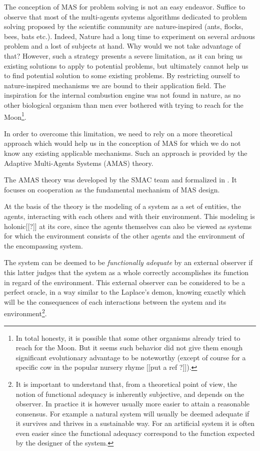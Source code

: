 The conception of MAS for problem solving is not an easy endeavor. Suffice to observe that most of the multi-agents systems algorithms dedicated to problem solving proposed by the scientific community are nature-inspired (ants, flocks, bees, bats etc.). Indeed, Nature had a long time to experiment on several arduous problem and a lost of subjects at hand. Why would we not take advantage of that? However, such a strategy presents a severe limitation, as it can bring us existing solutions to apply to potential problems, but ultimately cannot help us to find potential solution to some existing problems. By restricting ourself to nature-inspired mechanisms we are bound to their application field.
The inspiration for the internal combustion engine was not found in nature, as no other biological organism than men ever bothered with trying to reach for the Moon\footnote{In total honesty, it is possible that some other organisms already tried to reach for the Moon. But it seems such behavior did not give them enough significant evolutionary advantage to be noteworthy (except of course for a specific cow in the popular nursery rhyme [[put a ref ?]]).}.

In order to overcome this limitation, we need to rely on a more theoretical approach which would help us in the conception of MAS for which we do not know any existing applicable mechanisms. Such an approach is provided by the Adaptive Multi-Agents Systems (AMAS) theory.

The AMAS theory was developed by the SMAC team and formalized in \cite{glize2001adaptation}. It focuses on cooperation as the fundamental mechanism of MAS design.

At the basis of the theory is the modeling of a system as a set of entities, the agents, interacting with each others and with their environment. This modeling is holonic[[?]] at its core, since the agents themselves can also be viewed as systems for which the environment consists of the other agents and the environment of the encompassing system.

The system can be deemed to be \emph{functionally adequate} by an external observer if this latter judges that the system as a whole correctly accomplishes its function in regard of the environment. This external observer can be considered to be a perfect oracle, in a way similar to the Laplace's demon, knowing exactly which will be the consequences of each interactions between the system and its environment\footnote{It is important to understand that, from a theoretical point of view, the notion of functional adequacy is inherently subjective, and depends on the observer. In practice it is however usually more easier to attain a reasonable consensus. For example a natural system will usually be deemed adequate if it survives and thrives in a sustainable way. For an artificial system it is often even easier since the functional adequacy correspond to the function expected by the designer of the system.}.

